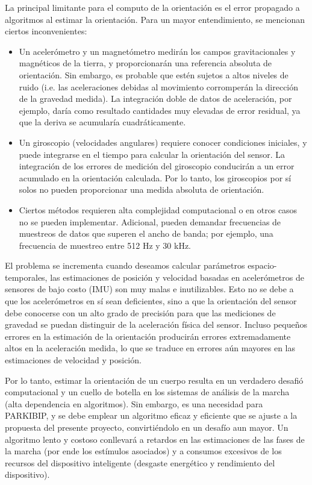 La principal limitante para el computo de la orientación es el error propagado a algoritmos al estimar la orientación. Para un mayor entendimiento, se mencionan ciertos inconvenientes: 
\begin{itemize}
    \item Un acelerómetro y un magnetómetro medirán los campos gravitacionales y magnéticos de la tierra, y proporcionarán una referencia absoluta de orientación. Sin embargo, es probable que estén sujetos a altos niveles de ruido (i.e. las aceleraciones debidas al movimiento corromperán la dirección de la gravedad medida). La integración doble de datos de aceleración, por ejemplo, daría como resultado cantidades muy elevadas de error residual, ya que la deriva se acumularía cuadráticamente.
    \item Un giroscopio (velocidades angulares) requiere conocer condiciones iniciales, y puede integrarse en el tiempo para calcular la orientación del sensor. La integración de los errores de medición del giroscopio conducirán a un error acumulado en la orientación calculada. Por lo tanto, los giroscopios por sí solos no pueden proporcionar una medida absoluta de orientación.
    \item Ciertos métodos requieren alta complejidad computacional o en otros casos no se pueden implementar. Adicional, pueden demandar frecuencias de muestreos de datos que superen el ancho de banda; por ejemplo, una frecuencia de muestreo entre 512 Hz y 30 kHz.
\end{itemize}

El problema se incrementa cuando deseamos calcular parámetros espacio-temporales, las estimaciones de posición y velocidad basadas en acelerómetros de sensores de bajo costo (IMU) son muy malas e inutilizables. Esto no se debe a que los acelerómetros en sí sean deficientes, sino a que la orientación del sensor debe conocerse con un alto grado de precisión para que las mediciones de gravedad se puedan distinguir de la aceleración física del sensor. Incluso pequeños errores en la estimación de la orientación producirán errores extremadamente altos en la aceleración medida, lo que se traduce en errores aún mayores en las estimaciones de velocidad y posición.

Por lo tanto, estimar la orientación de un cuerpo resulta en un verdadero desafió computacional y un cuello de botella en los sistemas de análisis de la marcha (alta dependencia en algoritmos). Sin embargo, es una necesidad para PARKIBIP, y se debe emplear un algoritmo eficaz y eficiente que se ajuste a la propuesta del presente proyecto, convirtiéndolo en un desafío aun mayor. Un algoritmo lento y costoso conllevará a retardos en las estimaciones de las fases de la marcha (por ende los estímulos asociados) y a consumos excesivos de los recursos del dispositivo inteligente (desgaste energético y rendimiento del dispositivo). 
 
